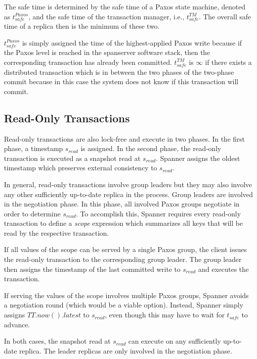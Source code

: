 \documentclass[onecolumn, a4paper, 10pt]{article}
\begin{document}
The safe time is determined by the safe time of a Paxos state machine, denoted
as $t_{safe}^{Paxos}$, and the safe time of the transaction manager, i.e.,
$t_{safe}^{TM}$. The overall safe time of a replica then is the minimum of
these two.

$t_{safe}^{Paxos}$ is simply assigned the time of the highest-applied Paxos write
because if the Paxos level is reached in the spanserver software stack, then the
corresponding transaction has already been committed. $t_{safe}^{TM}$ is $\infty$
if there exists a distributed transaction which is in between the two phases of
the two-phase commit because in this case the system does not know if this
transaction will commit.

\subsection{Read-Only Transactions}
\label{subsec:read-only-transactions}

Read-only transactions are also lock-free and execute in two phases. In the first
phase, a timestamp $s_{read}$ is assigned. In the second phase, the read-only
transaction is executed as a snapshot read at $s_{read}$. Spanner assigns
the oldest timestamp which preserves external consistency to $s_{read}$.

In general, read-only transactions involve group leaders but they may also involve
any other sufficiently up-to-date replica in the process. Group leaders are
involved in the negotiation phase. In this phase, all involved Paxos groups
negotiate in order to determine $s_{read}$. To accomplish this, Spanner requires
every read-only transaction to define a \emph{scope} expression which summarizes
all keys that will be read by the respective transaction.

If all values of the scope can be served by a single Paxos group, the client
issues the read-only transaction to the corresponding group leader. The group
leader then assigns the timestamp of the last committed write to $s_{read}$ and
executes the transaction.

If serving the values of the scope involves multiple Paxos groups, Spanner avoids
a negotiation round (which would be a viable option). Instead, Spanner simply
assigns $TT.now().latest$ to $s_{read}$, even though this may have to wait for
$t_{safe}$ to advance.

In both cases, the snapshot read at $s_{read}$ can execute on any sufficiently
up-to-date replica. The leader replicas are only involved in the negotiation
phase.
\end{document}
